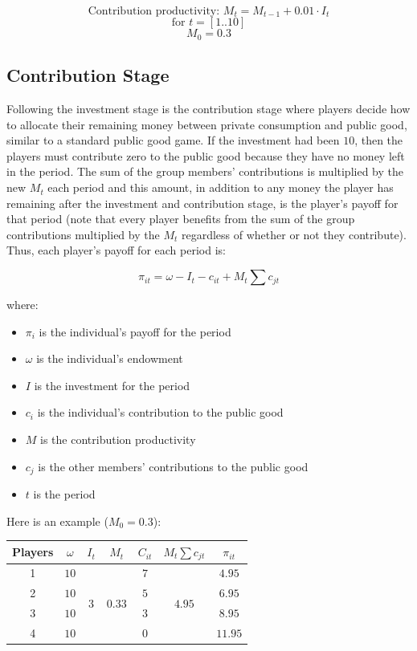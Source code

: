 		\[
			\text{Contribution productivity: } M_t = M_{t-1} + 0.01 \cdot I_t
		\]
		\[
			\text{for } t = [1..10]
		\]
		\[
			M_0 = 0.3
		\]
	
	\subsection{Contribution Stage}
	
		Following the investment stage is the contribution stage where players decide how to allocate their remaining money between private consumption and public good, similar to a standard public good game. If the investment had been $10$, then the players must contribute zero to the public good because they have no money left in the period. The sum of the group members' contributions is multiplied by the new $M_t$ each period and this amount, in addition to any money the player has remaining after the investment and contribution stage, is the player's payoff for that period (note that every player benefits from the sum of the group contributions multiplied by the $M_t$ regardless of whether or not they contribute). Thus, each player's payoff for each period is:

		\[
			\pi_{it} = \omega - I_t - c_{it} + M_t \sum c_{jt}
		\]
		
		where:
			\begin{itemize}
				\item
					$\pi_{i}$ is the individual's payoff for the period
				\item
					$\omega$ is the individual's endowment
				\item
					$I$ is the investment for the period
				\item
					$c_i$ is the individual's contribution to the public good
				\item
					$M$ is the contribution productivity
				\item
					$c_j$ is the other members' contributions to the public good
				\item
					$t$ is the period
			\end{itemize}

		Here is an example ($M_0 = 0.3$):
		\begin{center}
			\begin{tabular}{ | c | c | c | c | c | c | c |}
				\hline
				Players	& $\omega$	& $I_t$						& $M_t$					& $C_{it}$	& $M_t \sum c_{jt}$			& $\pi_{it}$	\\ \hline
				1		& $10$	& \multirow{4}{*}{$3$}	& \multirow{4}{*}{0.33}	& $7$		& \multirow{4}{*}{$4.95$}	& $4.95$		\\ 
				2		& $10$	& 							&						& $5$		&							& $6.95$		\\ 
				3		& $10$	& 							&						& $3$		&							& $8.95$		\\ 
				4		& $10$	& 							&						& $0$		&							& $11.95$		\\ \hline
			\end{tabular}
		\end{center}
		

